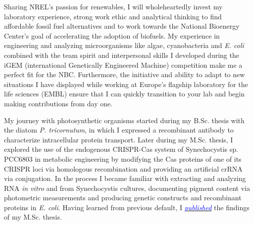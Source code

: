 \documentclass[11pt,a4paper,sans]{moderncv}
\date{\today}
\begin{document}
     
\makelettertitle
\begin{spacing}{1.2}


Sharing NREL's passion for renewables, I will wholeheartedly invest my laboratory experience, strong work ethic and analytical thinking to find affordable fossil fuel alternatives and to work towards the National Bioenergy Center's goal of accelerating the adoption of biofuels.
My experience in engineering and analyzing microorganisms like algae, cyanobacteria and \textit{E. coli} combined with the team spirit and interpersonal skills I developed during the iGEM (international Genetically Engineered Machine) competition make me a perfect fit for the NBC. 
Furthermore, the initiative and ability to adapt to new situations I have displayed while working at Europe's flagship laboratory for the life sciences (EMBL) ensure that I can quickly transition to your lab and begin making contributions from day one.\par\vspace*{3mm}


My journey with photosynthetic organisms started during my B.Sc. thesis with the diatom \textit{P. tricornutum}, in which I expressed a recombinant antibody to characterize intracellular protein transport. 
Later during my M.Sc. thesis, I explored the use of the endogenous CRISPR-Cas system of Synechocystis sp. PCC6803 in metabolic engineering by modifying the Cas proteins of one of its CRISPR loci via homologous recombination and providing an artificial crRNA via conjugation.
In the process I became familiar with extracting and analyzing RNA \textit{in vitro} and from Synechocystis cultures, documenting pigment content via photometric measurements and producing genetic constructs and recombinant proteins in \textit{E. coli}.
Having learned from previous default, I  {\href{https://www.tandfonline.com/eprint/vmAQ3vjYGdZIZpIKQTIT/full}{\textcolor{blue}{{\textit{published}}}}} the findings of my M.Sc. thesis.
\par\vspace*{3mm}
 

\end{spacing}
\end{document}
